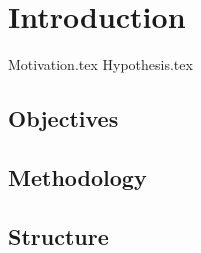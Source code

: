 \chapter{Introduction}
\label{chap:introduction}
  {Motivation.tex}
  {Hypothesis.tex}
  \section{Objectives}
  \label{sec:objectives}
    \Blindtext
  \section{Methodology}
  \label{sec:methodology}
    \Blindtext
  \section{Structure}
  \label{sec:structure}
    \Blindtext
